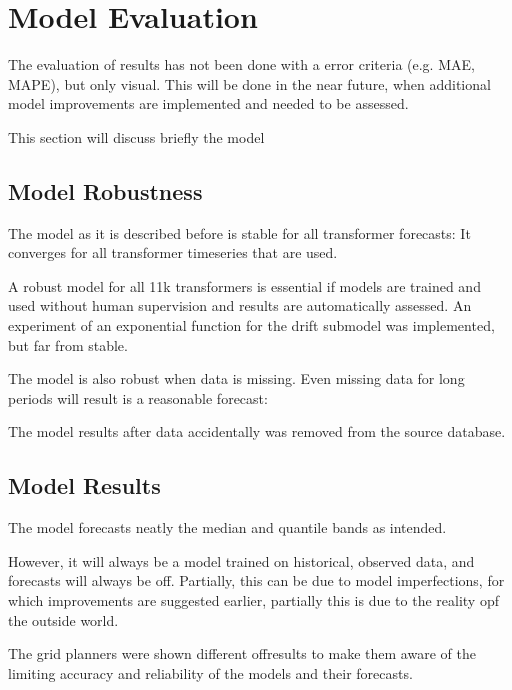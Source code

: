 \documentclass[letterpaper,10pt,english]{sphinxmanual}
\let\sphinxpxdimen\pdfpxdimen\else\newdimen\sphinxpxdimen
\begin{document}
\section{Model Evaluation}
\label{\detokenize{evaluation:model-evaluation}}
The evaluation of results has not been done with a error criteria (e.g. MAE, MAPE), but only visual.
This will be done in the near future, when additional model improvements are implemented and needed to be assessed.

This section will discuss briefly the model


\subsection{Model Robustness}
\label{\detokenize{evaluation:model-robustness}}
The model as it is described before is stable for all transformer forecasts: It converges for all transformer timeseries that are used.

A robust model for all 11k transformers is essential if models are trained and used without human supervision and results are automatically assessed.
An experiment of an exponential function for the drift sub\sphinxhyphen{}model was implemented, but far from stable.

The model is also robust when data is missing. Even missing data for long periods will result is a reasonable forecast:
\begin{quote}

\noindent{\hspace*{\fill}\sphinxincludegraphics[width=800\sphinxpxdimen]{{missing_data_results}.png}\hspace*{\fill}}
\end{quote}

The model results after data accidentally was removed from the source database.


\subsection{Model Results}
\label{\detokenize{evaluation:model-results}}
The model forecasts neatly the median and quantile bands as intended.

However, it will always be a model trained on historical, observed data, and forecasts will always be off.
Partially, this can be due to model imperfections, for which improvements are suggested earlier, partially this is due to the reality opf the outside world.

The grid planners were shown different off\sphinxhyphen{}results to make them aware of the limiting accuracy and reliability of the models and their forecasts.
\end{document}
